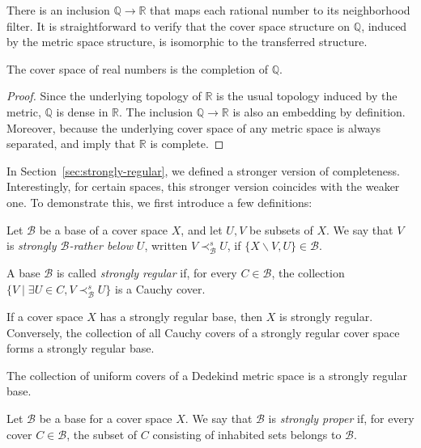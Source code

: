 \documentclass[pdflatex,sn-mathphys-num]{sn-jnl}
\theoremstyle{definition}
\theoremstyle{remark}
\numberwithin{figure}{section}
\newcommand{\rb}{\prec}
\begin{document}
There is an inclusion $\mathbb{Q} \to \mathbb{R}$ that maps each rational number to its neighborhood filter.
It is straightforward to verify that the cover space structure on $\mathbb{Q}$, induced by the metric space structure, is isomorphic to the transferred structure.

\begin{prop}
The cover space of real numbers is the completion of $\mathbb{Q}$.
\end{prop}
\begin{proof}
Since the underlying topology of $\mathbb{R}$ is the usual topology induced by the metric, $\mathbb{Q}$ is dense in $\mathbb{R}$.
The inclusion $\mathbb{Q} \to \mathbb{R}$ is also an embedding by definition.
Moreover, because the underlying cover space of any metric space is always separated,  and  imply that $\mathbb{R}$ is complete.
\end{proof}

In Section~\ref{sec:strongly-regular}, we defined a stronger version of completeness.
Interestingly, for certain spaces, this stronger version coincides with the weaker one.
To demonstrate this, we first introduce a few definitions:

\begin{defn}
Let $\mathcal{B}$ be a base of a cover space $X$, and let $U,V$ be subsets of $X$.
We say that $V$ is \emph{strongly $\mathcal{B}$-rather below} $U$, written $V \rb^s_\mathcal{B} U$, if $\{ X \backslash V, U \} \in \mathcal{B}$.

A base $\mathcal{B}$ is called \emph{strongly regular} if, for every $C \in \mathcal{B}$,
the collection $\{ V \mid \exists U \in C, V \rb^s_\mathcal{B} U \}$ is a Cauchy cover.
\end{defn}

\begin{remark}
If a cover space $X$ has a strongly regular base, then $X$ is strongly regular.
Conversely, the collection of all Cauchy covers of a strongly regular cover space forms a strongly regular base.
\end{remark}

\begin{example}
The collection of uniform covers of a Dedekind metric space is a strongly regular base.
\end{example}

\begin{defn}
Let $\mathcal{B}$ be a base for a cover space $X$.
We say that $\mathcal{B}$ is \emph{strongly proper} if, for every cover $C \in \mathcal{B}$, the subset of $C$ consisting of inhabited sets belongs to $\mathcal{B}$.
\end{defn}
\end{document}
